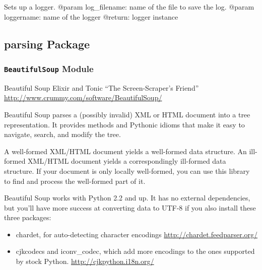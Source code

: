 \documentclass[letterpaper,10pt,english]{sphinxmanual}
\begin{document}

\begin{fulllineitems}
\label{SamPy.log:SamPy.log.Logger.setUpLogger}
Sets up a logger.
@param log\_filename: name of the file to save the log. 
@param loggername: name of the logger 
@return: logger instance

\end{fulllineitems}



\subsection{parsing Package}
\label{SamPy.parsing:parsing-package}\label{SamPy.parsing::doc}

\subsubsection{\texttt{BeautifulSoup} Module}
\label{SamPy.parsing:module-SamPy.parsing.BeautifulSoup}\label{SamPy.parsing:beautifulsoup-module}
Beautiful Soup
Elixir and Tonic
``The Screen-Scraper's Friend''
\href{http://www.crummy.com/software/BeautifulSoup/}{http://www.crummy.com/software/BeautifulSoup/}

Beautiful Soup parses a (possibly invalid) XML or HTML document into a
tree representation. It provides methods and Pythonic idioms that make
it easy to navigate, search, and modify the tree.

A well-formed XML/HTML document yields a well-formed data
structure. An ill-formed XML/HTML document yields a correspondingly
ill-formed data structure. If your document is only locally
well-formed, you can use this library to find and process the
well-formed part of it.

Beautiful Soup works with Python 2.2 and up. It has no external
dependencies, but you'll have more success at converting data to UTF-8
if you also install these three packages:
\begin{itemize}
\item {} 
chardet, for auto-detecting character encodings
\href{http://chardet.feedparser.org/}{http://chardet.feedparser.org/}

\item {} 
cjkcodecs and iconv\_codec, which add more encodings to the ones supported
by stock Python.
\href{http://cjkpython.i18n.org/}{http://cjkpython.i18n.org/}

\end{itemize}
\end{document}
